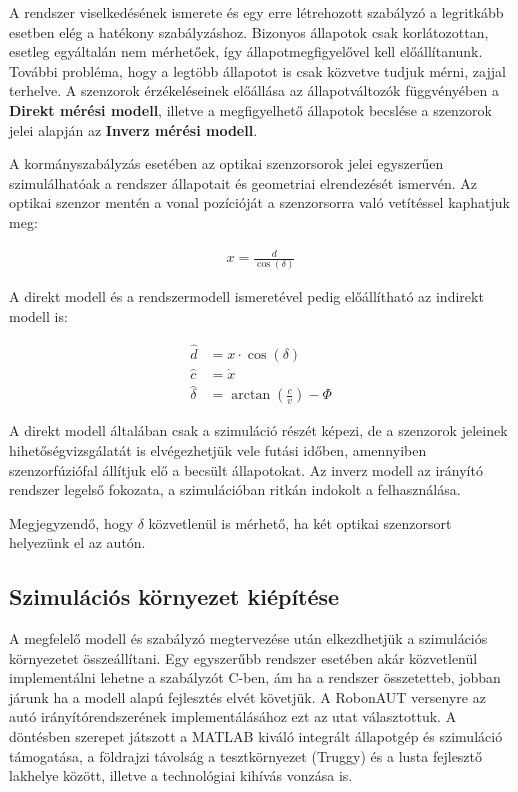 A rendszer viselkedésének ismerete és egy erre létrehozott szabályzó a legritkább esetben elég a hatékony szabályzáshoz. Bizonyos állapotok csak korlátozottan, esetleg egyáltalán nem mérhetőek, így állapotmegfigyelővel kell előállítanunk. További probléma, hogy a legtöbb állapotot is csak közvetve tudjuk mérni, zajjal terhelve.
A szenzorok érzékeléseinek előállása az állapotváltozók függvényében a \textbf{Direkt mérési modell}, illetve a megfigyelhető állapotok becslése a szenzorok jelei alapján az \textbf{Inverz mérési modell}.

A kormányszabályzás esetében az optikai szenzorsorok jelei egyszerűen szimulálhatóak a rendszer állapotait és geometriai elrendezését ismervén. Az optikai szenzor mentén a vonal pozícióját a szenzorsorra való vetítéssel kaphatjuk meg:

\begin{align}
    x = \frac{d}{\cos(\delta)}
\end{align}

A direkt modell és a rendszermodell ismeretével pedig előállítható az indirekt modell is:

\begin{align}
    \hat{d} &= x \cdot \cos(\delta) \\
    \hat{c} &=\dot{x} \\
    \hat{\delta} &= \arctan \left(\frac{c}{v}\right) - \Phi
\end{align}

A direkt modell általában csak a szimuláció részét képezi, de a szenzorok jeleinek hihetőségvizsgálatát is elvégezhetjük vele futási időben, amennyiben szenzorfúziófal állítjuk elő a becsült állapotokat.
Az inverz modell az irányító rendszer legelső fokozata, a szimulációban ritkán indokolt a felhasználása.

Megjegyzendő, hogy $\delta$ közvetlenül is mérhető, ha két optikai szenzorsort helyezünk el az autón.

\subsection{Szimulációs környezet kiépítése}

A megfelelő modell és szabályzó megtervezése után elkezdhetjük a szimulációs környezetet összeállítani. Egy egyszerűbb rendszer esetében akár közvetlenül implementálni lehetne a szabályzót C-ben, ám ha a rendszer összetetteb, jobban járunk ha a modell alapú fejlesztés elvét követjük. A RobonAUT versenyre az autó irányítórendszerének implementálásához ezt az utat választottuk. A döntésben szerepet játszott a MATLAB kiváló integrált állapotgép és szimuláció támogatása, a földrajzi távolság a tesztkörnyezet (Truggy) és a lusta fejlesztő lakhelye között, illetve a technológiai kihívás vonzása is.

